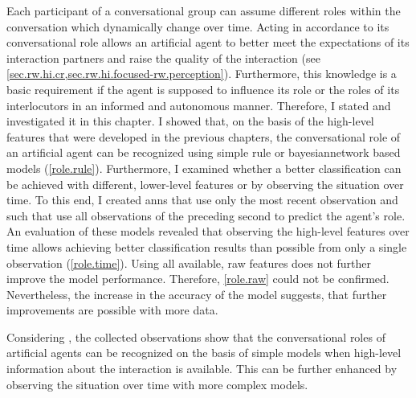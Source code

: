 Each participant of a \gls{conversational group} can assume different roles within the \gls{conversation} which dynamically change over time.
Acting in accordance to its \gls{conversational role} allows an \gls{artificial agent} to better meet the expectations of its interaction partners and raise the quality of the interaction (see \cref{sec.rw.hi.cr,sec.rw.hi.focused-rw.perception}).
Furthermore, this knowledge is a basic requirement if the agent is supposed to influence its role or the roles of its interlocutors in an informed and autonomous manner.
Therefore, I stated  and investigated it in this chapter.
I showed that, on the basis of the high-level features that were developed in the previous chapters, the \gls{conversational role} of an \gls{artificial agent} can be recognized using simple rule or \gls{bayesiannetwork} based models (\cref{role.rule}).
Furthermore, I examined whether a better classification can be achieved with different, lower-level features or by observing the situation over time.
To this end, I created \glspl{ann} that use only the most recent observation and such that use all observations of the preceding second to predict the agent's role.
An evaluation of these models revealed that observing the high-level features over time allows achieving better classification results than possible from only a single observation (\cref{role.time}).
Using all available, raw features does not further improve the model performance.
Therefore, \cref{role.raw} could not be confirmed.
Nevertheless, the increase in the \gls{accuracy} of the model suggests, that further improvements are possible with more data.

Considering , the collected observations show that the \glspl{conversational role} of \glspl{artificial agent} can be recognized on the basis of simple models when high-level information about the interaction is available.
This can be further enhanced by observing the situation over time with more complex models.

